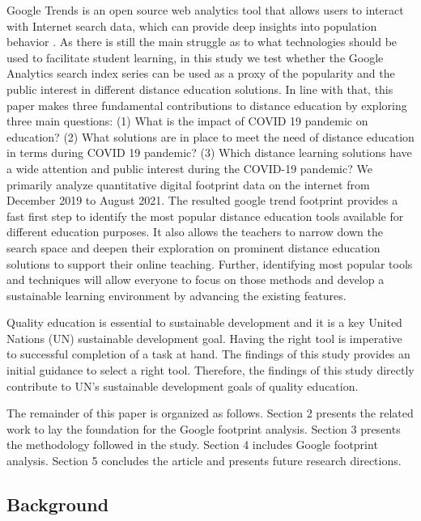 \documentclass[11pt,a4paper,]{article}
\begin{document}
Google Trends is an open source web analytics tool that allows users to interact with Internet search data, which can provide deep insights into population behavior \autocite{nuti2014use}. As there is still the main struggle as to what technologies should be used to facilitate student learning, in this study we test whether the Google Analytics search index series can be used as a proxy of the popularity and the public interest in different distance education solutions. In line with that, this paper makes three fundamental contributions to distance education by exploring three main questions: (1) What is the impact of COVID 19 pandemic on education? (2) What solutions are in place to meet the need of distance education in terms during COVID 19 pandemic? (3) Which distance learning solutions have a wide attention and public interest during the COVID-19 pandemic?
We primarily analyze quantitative digital footprint data on the internet from December 2019 to August 2021. The resulted google trend footprint provides a fast first step to identify the most popular distance education tools available for different education purposes. It also allows the teachers to narrow down the search space and deepen their exploration on prominent distance education solutions to support their online teaching. Further, identifying most popular tools and techniques will allow everyone to focus on those methods and develop a sustainable learning environment by advancing the existing features.

Quality education is essential to sustainable development and it is a key United Nations (UN) sustainable development goal. Having the right tool is imperative to successful completion of a task at hand. The findings of this study provides an initial guidance to select a right tool. Therefore, the findings of this study directly contribute to UN's sustainable development goals of quality education.

The remainder of this paper is organized as follows. Section 2 presents the related work to lay the foundation for the Google footprint analysis. Section 3 presents the methodology followed in the study. Section 4 includes Google footprint analysis. Section 5 concludes the article and presents future research directions.

\hypertarget{background}{%
\subsection{Background}\label{background}}
\end{document}
